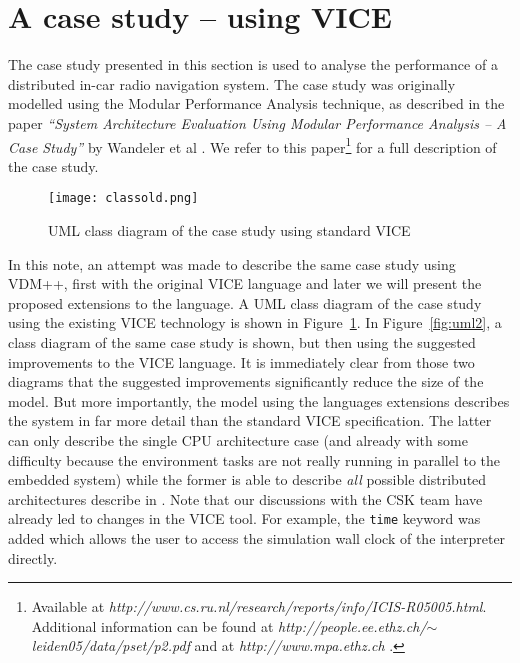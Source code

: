 \section{A case study -- using VICE}
\label{sec:viceorg}

The case study presented in this section is used to analyse the performance
of a distributed in-car radio navigation system. The case study was originally
modelled using the Modular Performance Analysis technique, as described in the
paper \textit{``System Architecture Evaluation Using Modular Performance
Analysis -- A Case Study''} by Wandeler et al \cite{orgcase}.
We refer to this paper\footnote{Available at
\textit{http://www.cs.ru.nl/research/reports/info/ICIS-R05005.html}.
Additional information can be found at
\textit{http://people.ee.ethz.ch/$\sim$leiden05/data/pset/p2.pdf}
and at \textit{http://www.mpa.ethz.ch} .} 
for a full description of the case study. 

\begin{figure}[!htb]
\begin{centering}
\texttt{[image: classold.png]}
\caption{UML class diagram of the case study using standard VICE}
\label{fig:uml1}
\end{centering}
\end{figure}

In this note, an attempt was made to describe the same case study using
VDM++, first with the original VICE language and later we will present the
proposed extensions to the language. A UML class diagram of the case study
using the existing VICE technology is shown in Figure~\ref{fig:uml1}.
In Figure~\ref{fig:uml2}, a class diagram of the same case study is shown,
but then using the suggested improvements to the VICE language. It is
immediately clear from those two diagrams that the suggested improvements
significantly reduce the size of the model. But more importantly,
the model using the languages extensions describes the system in
far more detail than the standard VICE specification. The latter can
only describe the single CPU architecture case (and already with some
difficulty because the environment tasks are not really running in
parallel to the embedded system) while the former is able to describe
\textit{all} possible distributed architectures describe in
\cite{orgcase}. Note that our discussions with the CSK team have
already led to changes in the VICE tool. For example, the \verb+time+
keyword was added which allows the user to access the simulation wall
clock of the interpreter directly.

